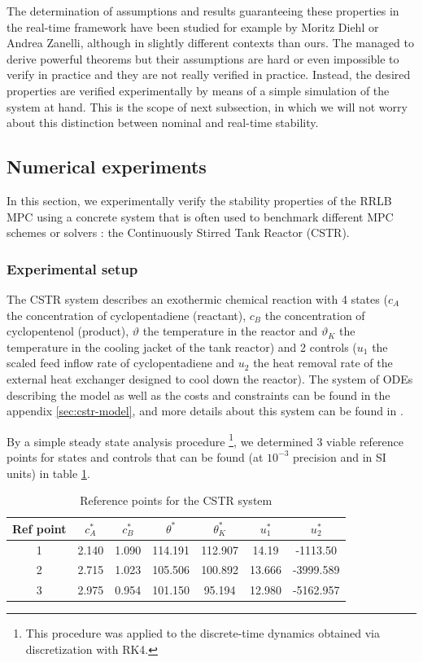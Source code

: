 \documentclass[12pt]{article}
\begin{document}
The determination of assumptions and results guaranteeing these properties in the real-time framework have been studied for example by Moritz Diehl or Andrea Zanelli, although in slightly different contexts than ours.
The managed to derive powerful theorems but their assumptions are hard or even impossible to verify in practice and they are not really verified in practice.
Instead, the desired properties are verified experimentally by means of a simple simulation of the system at hand.
This is the scope of next subsection, in which we will not worry about this distinction between nominal and real-time stability.


\subsection{Numerical experiments}\label{sec:RRLB-numerical-experiments}

In this section, we experimentally verify the stability properties of the RRLB MPC using a concrete system that is often used to benchmark different MPC schemes or solvers : the Continuously Stirred Tank Reactor (CSTR).

\subsubsection{Experimental setup}

The CSTR system describes an exothermic chemical reaction with 4 states ($c_A$ the concentration of cyclopentadiene (reactant), $c_B$ the concentration of cyclopentenol (product), $\vartheta$ the temperature in the reactor and $\vartheta_K$ the temperature in the cooling jacket of the tank reactor) and 2 controls ($u_1$ the scaled feed inflow rate of cyclopentadiene and $u_2$ the heat removal rate of the external heat exchanger designed to cool down the reactor).
The system of ODEs describing the model as well as the costs and constraints can be found in the appendix \ref{sec:cstr-model}, and more details about this system can be found in \cite{diehl-dissertation}.

By a simple steady state analysis procedure \footnote{This procedure was applied to the discrete-time dynamics obtained via discretization with RK4.}, we determined 3 viable reference points for states and controls that can be found (at $10^{-3}$ precision and in SI units) in table \ref{tab:CSTR-ref-points}.

\begin{table}%
	\centering
	\begin{tabular}{|c|c|c|c|c|c|c|}
		\hline
		Ref point & $c_A^*$ & $c_B^*$ & $\theta^*$ & $\theta_K^*$ & $u_1^*$ & $u_2^*$ \\
		\hline
		1 & 2.140 & 1.090 & 114.191 & 112.907 & 14.19 & -1113.50 \\
		\hline
		2 & 2.715 & 1.023 & 105.506 & 100.892 & 13.666 & -3999.589 \\
		\hline
		3 & 2.975 &  0.954 & 101.150 & 95.194 & 12.980 & -5162.957 \\
		\hline
	\end{tabular}
	\caption{Reference points for the CSTR system}
	\label{tab:CSTR-ref-points}
\end{table}
\end{document}
